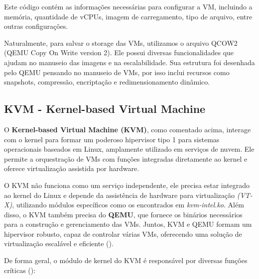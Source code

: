 Este código contém as informações necessárias para configurar a VM, incluindo a memória, quantidade de vCPUs, imagem de carregamento, tipo de arquivo, entre outras configurações.

Naturalmente, para salvar o storage das VMs, utilizamos o arquivo QCOW2 (QEMU Copy On Write version 2). Ele possui diversas funcionalidades que ajudam no manuseio das imagens e na escalabilidade. Sua estrutura foi desenhada pelo QEMU pensando no manuseio de VMs, por isso inclui recursos como snapshots, compressão, encriptação e redimensionamento dinâmico.


\subsection{KVM - Kernel-based Virtual Machine}

O \textbf{Kernel-based Virtual Machine (KVM)}, como comentado acima, interage com o kernel para formar um poderoso hipervisor tipo 1 para sistemas operacionais baseados em Linux, amplamente utilizado em serviços de nuvem. Ele permite a orquestração de VMs com funções integradas diretamente ao kernel e oferece virtualização assistida por hardware.

O KVM não funciona como um serviço independente, ele precisa estar integrado ao kernel do Linux e depende da assistência de hardware para virtualização \textit{(VT-X)}, utilizando módulos específicos como os encontrados em \textit{kvm-intel.ko}. Além disso, o KVM também precisa do \textbf{QEMU}, que fornece os binários necessários para a construção e gerenciamento das VMs. Juntos, KVM e QEMU formam um hipervisor robusto, capaz de controlar várias VMs, oferecendo uma solução de virtualização escalável e eficiente (\cite{chirammal2016mastering}).

De forma geral, o módulo de kernel do KVM é responsável por diversas funções críticas (\cite{chirammal2016mastering}):

